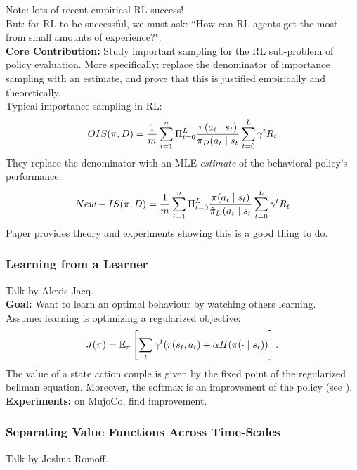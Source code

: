 Note: lots of recent empirical RL success! \\

But: for RL to be successful, we must ask: ``How can RL agents get the most from small amounts of experience?". \\

{\bf Core Contribution:} Study important sampling for the RL sub-problem of policy evaluation. More specifically: replace the denominator of importance sampling with an estimate, and prove that this is justified empirically and theoretically. \\

Typical importance sampling in RL:
\[
OIS(\pi, D) = \frac{1}{m} \sum_{i = 1}^n \Pi_{t=0}^L \frac{\pi(a_t \mid s_t)}{\pi_D(a_t \mid s_t} \sum_{t=0}^L \gamma^t R_t
\]
They replace the denominator with an MLE {\it estimate} of the behavioral policy's performance:
\[
New-IS(\pi, D) = \frac{1}{m} \sum_{i = 1}^n \Pi_{t=0}^L \frac{\pi(a_t \mid s_t)}{\hat{\pi}_D(a_t \mid s_t} \sum_{t=0}^L \gamma^t R_t
\]
Paper provides theory and experiments showing this is a good thing to do. 

\spacerule

\subsubsection{Learning from a Learner~\cite{jacq2019learning}}

Talk by Alexis Jacq. \\

{\bf Goal:} Want to learn an optimal behaviour by watching others learning. \\

Assume: learning is optimizing a regularized objective:
\[
J(\pi) = \mathbb{E}_\pi \left[ \sum_{t} \gamma^t(r(s_t,a_t) + \alpha H(\pi(\cdot \mid s_t))\right].
\]
The value of a state action couple is given by the fixed point of the regularized bellman equation. Moreover, the softmax is an improvement of the policy (see \citet{haarnoja2018soft}). \\

{\bf Experiments:} on MujoCo, find improvement.

\spacerule

\subsubsection{Separating Value Functions Across Time-Scales~\cite{romoff2019separating}}

Talk by Joshua Romoff. \\

